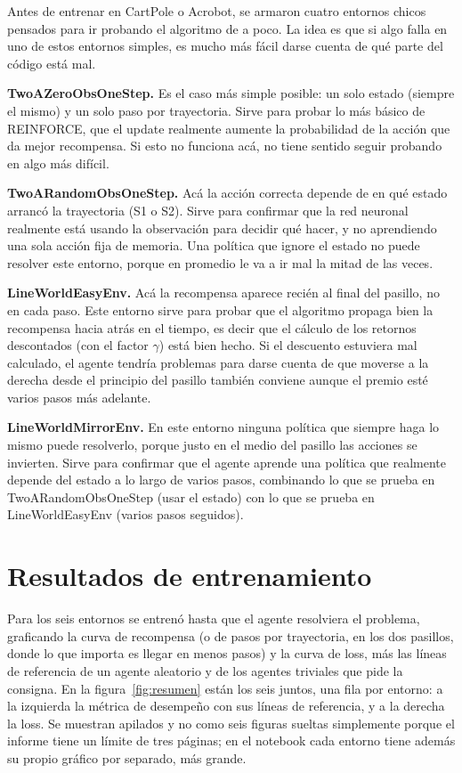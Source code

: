 \documentclass[10pt, a4paper, twocolumn]{article}
\begin{document}
Antes de entrenar en CartPole o Acrobot, se armaron cuatro entornos chicos pensados para ir probando el algoritmo de a poco. La idea es que si algo falla en uno de estos entornos simples, es mucho más fácil darse cuenta de qué parte del código está mal.

\textbf{TwoAZeroObsOneStep.} Es el caso más simple posible: un solo estado (siempre el mismo) y un solo paso por trayectoria. Sirve para probar lo más básico de REINFORCE, que el update realmente aumente la probabilidad de la acción que da mejor recompensa. Si esto no funciona acá, no tiene sentido seguir probando en algo más difícil.

\textbf{TwoARandomObsOneStep.} Acá la acción correcta depende de en qué estado arrancó la trayectoria (S1 o S2). Sirve para confirmar que la red neuronal realmente está usando la observación para decidir qué hacer, y no aprendiendo una sola acción fija de memoria. Una política que ignore el estado no puede resolver este entorno, porque en promedio le va a ir mal la mitad de las veces.

\textbf{LineWorldEasyEnv.} Acá la recompensa aparece recién al final del pasillo, no en cada paso. Este entorno sirve para probar que el algoritmo propaga bien la recompensa hacia atrás en el tiempo, es decir que el cálculo de los retornos descontados (con el factor $\gamma$) está bien hecho. Si el descuento estuviera mal calculado, el agente tendría problemas para darse cuenta de que moverse a la derecha desde el principio del pasillo también conviene aunque el premio esté varios pasos más adelante.

\textbf{LineWorldMirrorEnv.} En este entorno ninguna política que siempre haga lo mismo puede resolverlo, porque justo en el medio del pasillo las acciones se invierten. Sirve para confirmar que el agente aprende una política que realmente depende del estado a lo largo de varios pasos, combinando lo que se prueba en TwoARandomObsOneStep (usar el estado) con lo que se prueba en LineWorldEasyEnv (varios pasos seguidos).

\section{Resultados de entrenamiento}
\label{sec:resultados}

Para los seis entornos se entrenó hasta que el agente resolviera el problema, graficando la curva de recompensa (o de pasos por trayectoria, en los dos pasillos, donde lo que importa es llegar en menos pasos) y la curva de loss, más las líneas de referencia de un agente aleatorio y de los agentes triviales que pide la consigna. En la figura~\ref{fig:resumen} están los seis juntos, una fila por entorno: a la izquierda la métrica de desempeño con sus líneas de referencia, y a la derecha la loss. Se muestran apilados y no como seis figuras sueltas simplemente porque el informe tiene un límite de tres páginas; en el notebook cada entorno tiene además su propio gráfico por separado, más grande.
\end{document}
